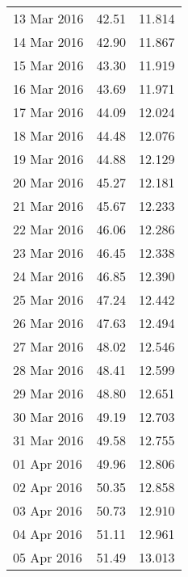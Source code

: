 \documentclass[11pt,a4paper,twoside]{article}
\begin{document}
\begin{longtable}{lcc}
13 Mar 2016                    & 42.51                & 11.814     \\
14 Mar 2016                    & 42.90                & 11.867     \\
15 Mar 2016                    & 43.30                & 11.919     \\
16 Mar 2016                    & 43.69                & 11.971     \\
17 Mar 2016                    & 44.09                & 12.024     \\
18 Mar 2016                    & 44.48                & 12.076     \\
19 Mar 2016                    & 44.88                & 12.129     \\
20 Mar 2016                    & 45.27                & 12.181     \\
21 Mar 2016                    & 45.67                & 12.233     \\
22 Mar 2016                    & 46.06                & 12.286     \\
23 Mar 2016                    & 46.45                & 12.338     \\
24 Mar 2016                    & 46.85                & 12.390     \\
25 Mar 2016                    & 47.24                & 12.442     \\
26 Mar 2016                    & 47.63                & 12.494     \\
27 Mar 2016                    & 48.02                & 12.546     \\
28 Mar 2016                    & 48.41                & 12.599     \\
29 Mar 2016                    & 48.80                & 12.651     \\
30 Mar 2016                    & 49.19                & 12.703     \\
31 Mar 2016                    & 49.58                & 12.755     \\
01 Apr 2016                    & 49.96                & 12.806     \\
02 Apr 2016                    & 50.35                & 12.858     \\
03 Apr 2016                    & 50.73                & 12.910     \\
04 Apr 2016                    & 51.11                & 12.961     \\
05 Apr 2016                    & 51.49                & 13.013     \\

\end{longtable}
\end{document}

